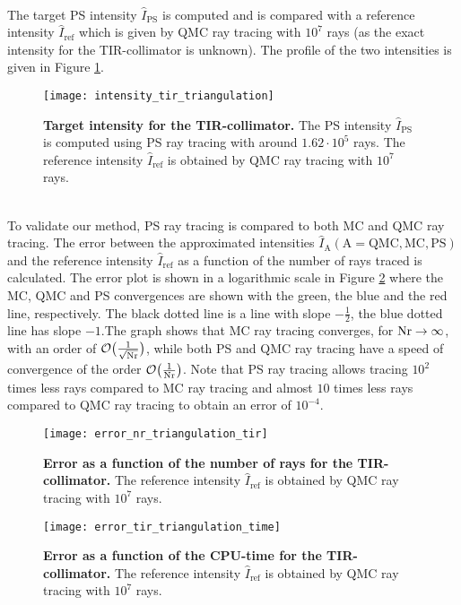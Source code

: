  \\ \indent 
The target PS intensity $\hat{I}_{\textrm{PS}}$ is computed and is compared with a reference intensity $\hat{I}_{\textrm{ref}}$ which is given by QMC ray tracing with $10^7$ rays (as the exact intensity for the TIR-collimator is unknown). The profile of the two intensities is given in Figure \ref{fig:intensity_tir_triangulation}.
 \begin{figure}[ht]
  \center
  \texttt{[image: intensity\_tir\_triangulation]}
  \caption{\textbf{Target intensity for the TIR-collimator.} The PS intensity $\hat{I}_{\textrm{PS}}$ is computed using PS ray tracing with around $1.62\cdot 10^5$ rays. The reference intensity $\hat{I}_{\textrm{ref}}$ is obtained by QMC ray tracing with $10^7$ rays.}
  \label{fig:intensity_tir_triangulation}
\end{figure}
\\ \indent
To validate our method, PS ray tracing is compared to both MC and QMC ray tracing. The error between the approximated intensities $\hat{I}_{\textrm{A}} (\textrm{A}=\textrm{QMC}, \textrm{MC}, \textrm{PS})$ and the reference intensity $\hat{I}_{\textrm{ref}}$ as a function of the number of rays traced is calculated. The error plot is shown in a logarithmic scale in Figure \ref{fig:error_tir_triangulation} where the MC, QMC and PS convergences are shown with the green, the blue and the red line, respectively. The black dotted line is a line with slope $-\frac{1}{2}$, the blue dotted line has slope $-1$.The graph shows that MC ray tracing converges, for $\textrm{Nr} \rightarrow \infty$, with an order of $\mathcal{O}\big(\frac{1}{\sqrt{\textrm{Nr}}}\big)$, while both PS and QMC ray tracing have a speed of convergence of the order $\mathcal{O}\big(\frac{1}{\textrm{Nr}}\big)$. 
Note that PS ray tracing allows tracing $10^2$ times less rays compared to MC ray tracing and almost $10$ times less rays compared to QMC ray tracing to obtain an error of $10^{-4}$.
 \begin{figure}[h!]
  \center
  \texttt{[image: error\_nr\_triangulation\_tir]}
  \caption{\textbf{Error as a function of the number of rays for the TIR-collimator.} The reference intensity $\hat{I}_{\textrm{ref}}$ is obtained by QMC ray tracing with $10^7$ rays.}
  \label{fig:error_tir_triangulation}
\end{figure}
\begin{figure}[h!]
  \center
  \texttt{[image: error\_tir\_triangulation\_time]}
  \caption{\textbf{Error as a function of the CPU-time for the TIR-collimator.} The reference intensity $\hat{I}_{\textrm{ref}}$ is obtained by QMC ray tracing with $10^7$ rays.}
  \label{fig:error_tir_triangulation_time}
\end{figure}
